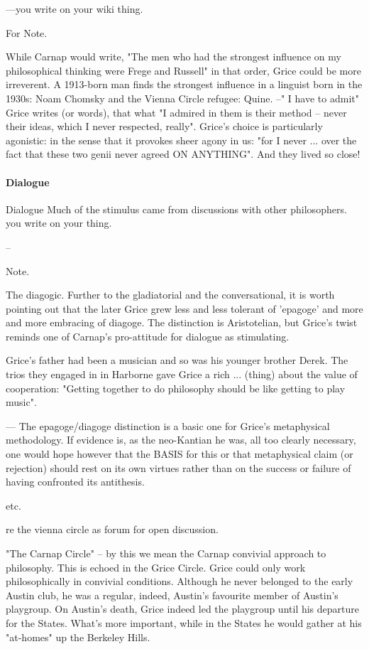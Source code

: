 \documentclass[10pt,titlepage]{book}
\begin{document}
---you write on your wiki thing.
 
For Note.

While Carnap would write, "The men who had the strongest  influence on my 
philosophical thinking were Frege and Russell" in that order,  Grice could be 
more irreverent. A 1913-born man finds the strongest influence in  a 
linguist born in the 1930s: Noam Chomsky and the Vienna Circle refugee: Quine.  --"
I have to admit" Grice writes (or words), that what "I admired in them is  
their method -- never their ideas, which I never respected, really". Grice's 
 choice is particularly agonistic: in the sense that it provokes sheer 
agony in  us: "for I never ... over the fact that these two genii never agreed 
ON  ANYTHING".
And they lived so close!
 
 
\paragraph{Dialogue}

Dialogue
Much of the stimulus came from discussions with other  philosophers.
you write on your thing.
 
--
 
Note.

The diagogic. Further to the gladiatorial and the conversational, it is  
worth pointing out that the later Grice grew less and less tolerant of 
'epagoge'  and more and more embracing of diagoge. The distinction is Aristotelian, 
but  Grice's twist reminds one of Carnap's pro-attitude for dialogue as  
stimulating.
 
Grice's father had been a musician and so was his younger brother Derek.  
The trios they engaged in in Harborne gave Grice a rich ... (thing) about the 
 value of cooperation: "Getting together to do philosophy should be like 
getting  to play music".
 
---
The epagoge/diagoge distinction is a basic one for Grice's metaphysical  
methodology. If evidence is, as the neo-Kantian he was, all too clearly  
necessary, one would hope however that the BASIS for this or that metaphysical  
claim (or rejection) should rest on its own virtues rather than on the 
success  or failure of having confronted its antithesis.
 
etc. 
 
re the vienna circle as forum for open discussion.
 
"The Carnap Circle" -- by this we mean the Carnap convivial approach to  
philosophy. This is echoed in the Grice Circle. Grice could only work  
philosophically in convivial conditions. Although he never belonged to the early  
Austin club, he was a regular, indeed, Austin's favourite member of Austin's  
playgroup. On Austin's death, Grice indeed led the playgroup until his 
departure  for the States. What's more important, while in the States he would 
gather at  his "at-homes" up the Berkeley Hills.
 
\end{document}
